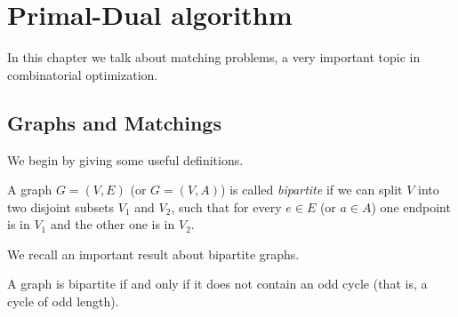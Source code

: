 \chapter{Primal-Dual algorithm}
\label{cha:pdalgo}


In this chapter we talk about matching problems, a very
important topic in combinatorial optimization.

\section{Graphs and Matchings}
\label{sec:gandm}




We begin by giving some useful definitions.

\begin{definition}
   A graph $G=(V,E)$ (or $G=(V,A)$) is called \emph{bipartite} 
   if we can split $V$ into two disjoint subsets $V_1$ and $V_2$,
   such that for every $e \in E$ (or $a \in A$) one endpoint is
   in $V_1$ and the other one is in $V_2$.
\end{definition}


We recall an important result about bipartite graphs.

\begin{lemma}
   A graph is bipartite if and only if it does not contain
   an odd cycle (that is, a cycle of odd length).
\end{lemma}

